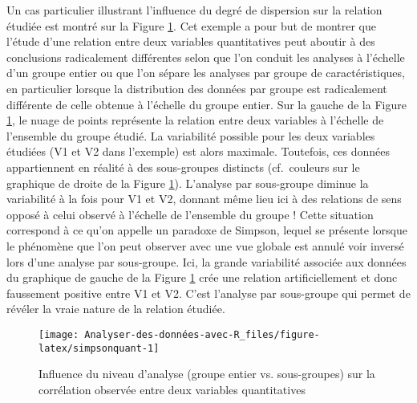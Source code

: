 \documentclass[
  french,
]{book}
\begin{document}
Un cas particulier illustrant l'influence du degré de dispersion sur la relation étudiée est montré sur la Figure \ref{fig:simpsonquant}. Cet exemple a pour but de montrer que l'étude d'une relation entre deux variables quantitatives peut aboutir à des conclusions radicalement différentes selon que l'on conduit les analyses à l'échelle d'un groupe entier ou que l'on sépare les analyses par groupe de caractéristiques, en particulier lorsque la distribution des données par groupe est radicalement différente de celle obtenue à l'échelle du groupe entier. Sur la gauche de la Figure \ref{fig:simpsonquant}, le nuage de points représente la relation entre deux variables à l'échelle de l'ensemble du groupe étudié. La variabilité possible pour les deux variables étudiées (V1 et V2 dans l'exemple) est alors maximale. Toutefois, ces données appartiennent en réalité à des sous-groupes distincts (cf.~couleurs sur le graphique de droite de la Figure \ref{fig:simpsonquant}). L'analyse par sous-groupe diminue la variabilité à la fois pour V1 et V2, donnant même lieu ici à des relations de sens opposé à celui observé à l'échelle de l'ensemble du groupe ! Cette situation correspond à ce qu'on appelle un paradoxe de Simpson, lequel se présente lorsque le phénomène que l'on peut observer avec une vue globale est annulé voir inversé lors d'une analyse par sous-groupe. Ici, la grande variabilité associée aux données du graphique de gauche de la Figure \ref{fig:simpsonquant} crée une relation artificiellement et donc faussement positive entre V1 et V2. C'est l'analyse par sous-groupe qui permet de révéler la vraie nature de la relation étudiée.

\begin{figure}

{\centering \texttt{[image: Analyser-des-données-avec-R\_files/figure-latex/simpsonquant-1]} 

}

\caption{Influence du niveau d'analyse (groupe entier vs. sous-groupes) sur la corrélation observée entre deux variables quantitatives}\label{fig:simpsonquant}
\end{figure}
\end{document}
